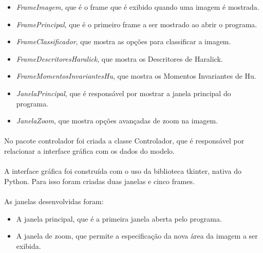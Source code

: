 \documentclass[12pt]{article}
\begin{document}
\begin{itemize}
    \item \textit{FrameImagem}, que é o frame que é exibido quando uma imagem é mostrada.

    \item \textit{FramePrincipal}, que é o primeiro frame a ser mostrado ao abrir o programa.
    
    \item \textit{FrameClassificador}, que mostra as opções para classificar a imagem.
    
    \item \textit{FrameDescritoresHaralick}, que mostra os Descritores de Haralick.

    \item \textit{FrameMomentosInvariantesHu}, que mostra os Momentos Invariantes de Hu.

    \item \textit{JanelaPrincipal}, que é responsável por mostrar a janela principal do programa.
    
    \item \textit{JanelaZoom}, que mostra opções avançadas de zoom na imagem.
\end{itemize}

\paragraph{}No pacote controlador foi criada a classe Controlador, que é responsável por relacionar a interface gráfica com os dados do modelo.

\paragraph{}A interface gráfica foi construída com o uso da biblioteca tkinter, nativa do Python. Para isso foram criadas duas janelas e cinco frames.

\paragraph{}As janelas desenvolvidas foram:

\begin{itemize}
    \item A janela principal, que é a primeira janela aberta pelo programa.

    \item A janela de zoom, que permite a especificação da nova área da imagem a ser exibida.
\end{itemize}
\end{document}
